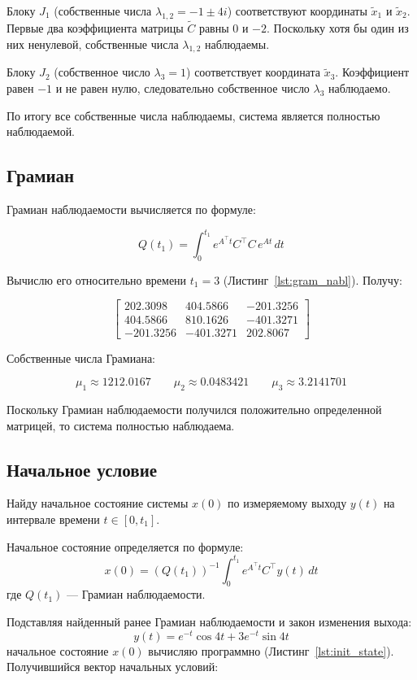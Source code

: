 \documentclass[a4paper,12pt]{article}
\begin{document}
	Блоку $J_1$ (собственные числа $\lambda_{1,2} = -1 \pm 4i$)
	соответствуют координаты $\tilde{x}_1$ и $\tilde{x}_2$.
	Первые два коэффициента матрицы $\tilde{C}$ равны 0 и $-2$.
	Поскольку хотя бы один из них ненулевой, собственные числа $\lambda_{1,2}$ наблюдаемы.
	
	Блоку $J_2$ (собственное число $\lambda_3 = 1$)
	соответствует координата $\tilde{x}_3$.
	Коэффициент равен $-1$ и не равен нулю, следовательно собственное число $\lambda_3$ наблюдаемо.
	
	По итогу все собственные числа наблюдаемы, система является полностью наблюдаемой.
	
	\subsection{Грамиан}
	
	Грамиан наблюдаемости вычисляется по формуле:
	
	\[
	Q(t_1) = \int_0^{t_1} e^{A^\top t} C^\top C \, e^{A t} \, dt
	\]
	
	Вычислю его относительно времени \(t_1 = 3\) (Листинг~\ref{lst:gram_nabl}). Получу:
	
	\[
	\begin{bmatrix}
  202.3098 & 404.5866 & -201.3256 \\
		404.5866 & 810.1626 & -401.3271 \\
		-201.3256 & -401.3271 & 202.8067
	\end{bmatrix}
	\]
	
	Собственные числа Грамиана:
	
	\[
	\mu_1 \approx 1212.0167
	\qquad
	\mu_2 \approx 0.0483421
	\qquad
	\mu_3 \approx 3.2141701
	\]
		
	Поскольку Грамиан наблюдаемости получился положительно определенной матрицей, то система полностью наблюдаема.
	
	\subsection{Начальное условие}
	
	Найду начальное состояние системы $x(0)$ по измеряемому выходу $y(t)$
	на интервале времени $t \in [0,t_1]$.
	
	Начальное состояние определяется по формуле:
	\[
	x(0) =
	\left(Q(t_1)\right)^{-1}
	\int_0^{t_1}
	e^{A^\top t} C^\top y(t) \, dt
	\]
	где $Q(t_1)$ --- Грамиан наблюдаемости.

	Подставляя найденный ранее Грамиан наблюдаемости и закон изменения выхода:
	\[
	y(t) = e^{-t}\cos 4t + 3e^{-t}\sin 4t
	\]
	начальное состояние $x(0)$ вычисляю программно
	(Листинг~\ref{lst:init_state}). Получившийся вектор начальных условий:
	
\end{document}
